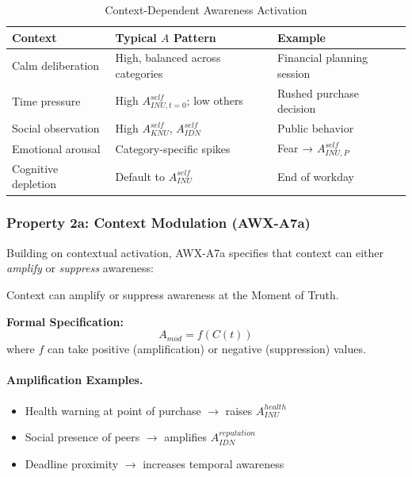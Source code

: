 \begin{table}[htbp]
\centering
\caption{Context-Dependent Awareness Activation}
\label{tab:context-awareness}
\renewcommand{\arraystretch}{1.3}
\begin{tabular}{@{}lll@{}}
\toprule
\textbf{Context} & \textbf{Typical $A$ Pattern} & \textbf{Example} \\
\midrule
Calm deliberation & High, balanced across categories & Financial planning session \\
Time pressure & High $A^{self}_{INU,t=0}$; low others & Rushed purchase decision \\
Social observation & High $A^{self}_{KNU}$, $A^{self}_{IDN}$ & Public behavior \\
Emotional arousal & Category-specific spikes & Fear → $A^{self}_{INU,P}$ \\
Cognitive depletion & Default to $A^{self}_{INU}$ & End of workday \\
\bottomrule
\end{tabular}
\end{table}


\subsubsection{Property 2a: Context Modulation (AWX-A7a)}

Building on contextual activation, AWX-A7a specifies that context can either 
\emph{amplify} or \emph{suppress} awareness:

\begin{axiom}
Context can amplify or suppress awareness at the Moment of Truth.

\textbf{Formal Specification:}
\begin{equation}
A_{mod} = f(C(t))
\end{equation}
where $f$ can take positive (amplification) or negative (suppression) values.
\end{axiom}

\paragraph{Amplification Examples.}
\begin{itemize}
    \item Health warning at point of purchase $\rightarrow$ raises $A_{INU}^{health}$
    \item Social presence of peers $\rightarrow$ amplifies $A_{IDN}^{reputation}$
    \item Deadline proximity $\rightarrow$ increases temporal awareness
\end{itemize}

